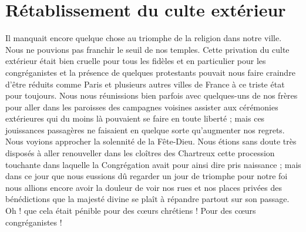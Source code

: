 \section*{Rétablissement du culte extérieur}
Il manquait encore quelque chose au triomphe de la religion dans notre ville. Nous ne pouvions pas franchir le seuil de nos temples. Cette privation du culte extérieur était bien cruelle pour tous les fidèles et en particulier pour les congréganistes et la présence de quelques protestants pouvait nous faire craindre d'être réduits comme Paris et plusieurs autres villes de France à ce triste état pour toujours. Nous nous réunissions bien parfois avec quelques-uns de nos frères pour aller dans les paroisses des campagnes voisines assister aux cérémonies extérieures qui du moins là pouvaient se faire en toute liberté ; mais ces jouissances passagères ne faisaient en quelque sorte qu'augmenter nos regrets. Nous voyions approcher la solennité de la Fête-Dieu. Nous étions sans doute très disposés à aller renouveller dans les cloîtres des Chartreux cette procession touchante dans laquelle la Congrégation avait pour ainsi dire pris naissance ; mais dans ce jour que nous eussions dû regarder un jour de triomphe pour notre foi nous allions encore avoir la douleur de voir nos rues et nos places privées des bénédictions que la majesté divine se plaît à répandre partout sur son passage. Oh ! que cela était pénible pour des cœurs chrétiens ! Pour des cœurs congréganistes !

